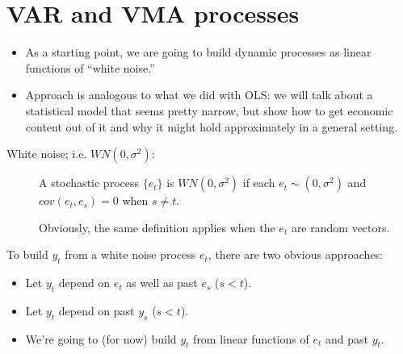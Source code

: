 \section{VAR and VMA processes}

\begin{itemize}
\item As a starting point, we are going to build dynamic processes as
  linear functions of ``white noise.''
\item Approach is analogous to what we did with OLS: we will talk
  about a statistical model that seems pretty narrow, but show how to
  get economic content out of it and why it might hold approximately
  in a general setting.
\end{itemize}

\begin{description}
\item[White noise; i.e. $WN(0,σ^2)$:]
  A stochastic process $\{e_t\}$ is $WN(0, σ^2)$ if each $e_t ∼ (0,
  σ^2)$ and $cov(e_t, e_s) = 0$ when $s ≠ t$.

  Obviously, the same definition applies when the $e_t$ are random
  vectors.
\end{description}

To build $y_t$ from a white noise process $e_t$, there are two obvious
approaches:
\begin{itemize}
\item Let $y_t$ depend on $e_t$ as well as past $e_s$ ($s < t$).
\item Let $y_t$ depend on past $y_s$ ($s < t$).
\item We're going to (for now) build $y_t$ from linear functions of
  $e_t$ and past $y_t$.
\end{itemize}


